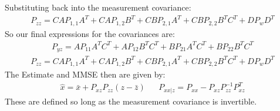 \documentclass{article}
\begin{document}
Substituting back into the measurement covariance:
\begin{align*}
P_{zz} = C A P_{1,1} A^T + C A P_{1,2} B^T + CBP_{2,1} A^T + C B P_{2,2} B^T C^T + D P_w D^T
\end{align*}
So our final expressions for the covariances are:
\begin{align*}
\boxed{ P_{yz} = A P_{11} A^TC^T + A P_{12} B^T C^T + B P_{21} A^T C^T + B P_{22} B^T C^T }
\end{align*}
\begin{align*}
\boxed{ P_{zz} = C A P_{1,1} A^T + C A P_{1,2} B^T + CBP_{2,1} A^T + C B P_{2,2} B^T C^T + D P_w D^T }
\end{align*}
The Estimate and MMSE then are given by:
\begin{align*}
\hat{x} = \bar{x} + P_{xz}P_{zz} (z-\bar{z}) && P_{xx|z} = P_{xx} - P_{xz} P_{zz}^{-1} P_{xz}^T
\end{align*}
These are defined so long as the measurement covariance is invertible.
\end{document}
